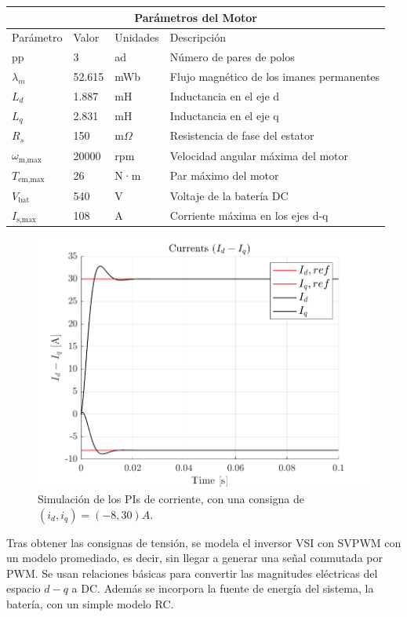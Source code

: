 \begin{tabular}{|p{2cm}||p{1cm}|p{1.5cm}|p{7cm}|}
 \hline
 \multicolumn{4}{|c|}{Parámetros del Motor} \\
 \hline
 Parámetro & Valor & Unidades & Descripción \\
 \hline
 pp & 3 & ad & Número de pares de polos \\
 $\lambda_m$ & 52.615 & mWb & Flujo magnético de los imanes permanentes \\
 $L_d$ & 1.887 & mH & Inductancia en el eje d \\
 $L_q$ & 2.831 & mH & Inductancia en el eje q \\
 $R_s$ & 150 & m$\Omega$ & Resistencia de fase del estator \\
 $\omega_{\text{m,max}}$ & 20000 & rpm & Velocidad angular máxima del motor \\
 $T_{\text{em,max}}$ & 26 & N·m & Par máximo del motor \\
 $V_{\text{bat}}$ & 540 & V & Voltaje de la batería DC \\
 $I_{\text{s,max}}$ & 108 & A & Corriente máxima en los ejes d-q \\
 \hline
\end{tabular}



\begin{figure}[H]
    \centering
    \includegraphics[width=0.75\linewidth]{fig/idiq_plot_PI.png}
    \caption{Simulación de los PIs de corriente, con una consigna de $(i_d, i_q) = (-8, 30) A$.}
\end{figure}


Tras obtener las consignas de tensión, se modela el inversor VSI con SVPWM con un modelo promediado, es decir, sin llegar a generar una señal conmutada por PWM. Se usan relaciones básicas para convertir las magnitudes eléctricas del espacio $d-q$ a DC. Además se incorpora la fuente de energía del sistema, la batería, con un simple modelo RC.

